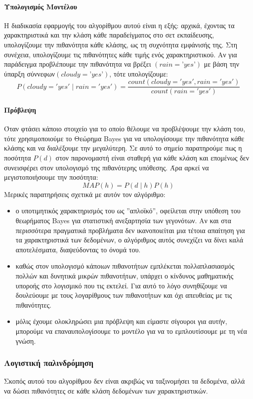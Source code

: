 \documentclass{article}
\begin{document}
\paragraph{Υπολογισμός Μοντέλου} Η διαδικασία εφαρμογής του αλγορίθμου αυτού είναι η εξής: αρχικά, έχοντας τα χαρακτηριστικά και την κλάση κάθε παραδείγματος στο σετ εκπαίδευσης, υπολογίζουμε την πιθανότητα κάθε κλάσης, ως τη συχνότητα εμφάνισής της. Στη συνέχεια, υπολογίζουμε τις πιθανότητες κάθε τιμής ενός χαρακτηριστικού. Αν για παράδειγμα προβλέπουμε την πιθανότητα να βρέξει $(rain=’yes’)$ με βάση την ύπαρξη σύννεφων$(cloudy=’yes’)$, τότε υπολογίζουμε:
$$P(cloudy= 'yes' \mid rain='yes')= \frac{count(cloudy='yes' , rain ='yes')}{count(rain='yes')}$$
\paragraph{Πρόβλεψη} Όταν φτάσει κάποιο στοιχείο για το οποίο θέλουμε να προβλέψουμε την κλάση του, τότε χρησιμοποιούμε το Θεώρημα Bayes για να υπολογίσουμε την πιθανότητα κάθε κλάσης και να διαλέξουμε την μεγαλύτερη. Σε αυτό το σημείο παρατηρούμε πως η ποσότητα $P(d)$ στον παρονομαστή είναι σταθερή
για κάθε κλάση και επομένως δεν συνεισφέρει στον υπολογισμό της πιθανότερης υπόθεσης. Άρα αρκεί να μεγιστοποιήσουμε την ποσότητα:
$$MAP(h)=P(d \mid h) P(h)$$
Μερικές παρατηρήσεις σχετικά με αυτόν τον αλγόριθμο:
\begin{itemize}
\item ο υποτιμητικός χαρακτηρισμός του ως ”απλοϊκό”, οφείλεται στην υπόθεση του θεωρήματος Bayes για στατιστική ανεξαρτησία των γεγονότων. Αν και στα περισσότερα πραγματικά προβλήματα δεν ικανοποιείται μια τέτοια απαίτηση για τα χαρακτηριστικά των δεδομένων, ο αλγόριθμος αυτός συνεχίζει να δίνει καλά αποτελέσματα, διαψεύδοντας το όνομά του.
\item καθώς στον υπολογισμό κάποιων πιθανοτήτων εμπλέκεται πολλαπλασιασμός πολλών και δυνητικά μικρών πιθανοτήτων, υπάρχει ο κίνδυνος μαθηματικής υποροής στο λογισμικό που τις εκτελεί. Για αυτό το λόγο συνηθίζουμε να δουλεύουμε με τους λογαρίθμους των πιθανοτήτων και όχι απευθείας με τις πιθανότητες.
\item μόλις έχουμε ολοκληρώσει μια πρόβλεψη και είμαστε σίγουροι για αυτήν, μπορούμε να επαναυπολογίσουμε το μοντέλο για να το εμπλουτίσουμε με τη νέα γνώση.
\end{itemize}
\subsubsection{Λογιστική παλινδρόμηση}
Σκοπός αυτού του αλγορίθμου δεν είναι ακριβώς να ταξινομήσει τα δεδομένα, αλλά να δώσει πιθανότητες σε κάθε κλάση δεδομένων των χαρακτηριστικών.
\end{document}
